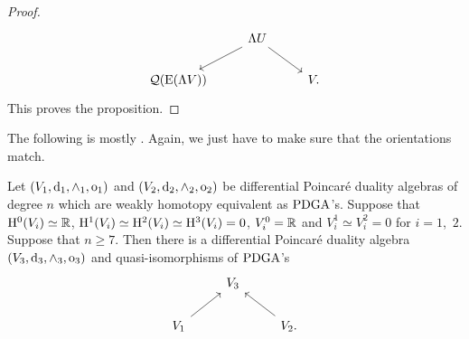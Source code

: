 \documentclass[\MainFolder/Text.tex]{subfiles}
\begin{document}
\begin{proof}
\begin{equation}\label{Eq:ModThree}\begin{tikzcd}
 & \Lambda U \arrow{dl}\arrow{dr} & \\
\VansQuotient(\LambrechtsExtension(\Lambda V))& & V.
\end{tikzcd}\end{equation}
This proves the proposition.
\end{proof}

The following is mostly \cite[Theorem~7.1]{Lambrechts2007}. Again, we just have to make sure that the orientations match.

\begin{Proposition}\label{Prop:LambrechtUnique}
Let $(V_1,\mathrm{d}_1,\wedge_1,\mathrm{o}_1)$ and $(V_2,\mathrm{d}_2,\wedge_2,\mathrm{o}_2)$ be differential Poincar\'e duality algebras of degree $n$ which are weakly homotopy equivalent as $\mathrm{PDGA}$'s. Suppose that $\mathrm{H}^0(V_i)\simeq \mathbb{R}$, $\mathrm{H}^1(V_i) \simeq \mathrm{H}^2(V_i) \simeq \mathrm{H}^3(V_i) = 0$, $V_i^0 = \mathbb{R}$ and $V_i^1 \simeq V_i^2 = 0$ for $i=1$,~$2$. Suppose that $n\ge 7$. Then there is a differential Poincar\'e duality algebra $(V_3,\mathrm{d}_3,\wedge_3,\mathrm{o}_3)$ and quasi-isomorphisms of $\mathrm{PDGA}$'s
\begin{equation}\label{Eq:LambrechtsZigZag}
\begin{tikzcd}
& V_3 & \\
V_1\arrow{ur}& & \arrow{ul}V_2.
\end{tikzcd}
\end{equation}
\end{Proposition}
\end{document}
